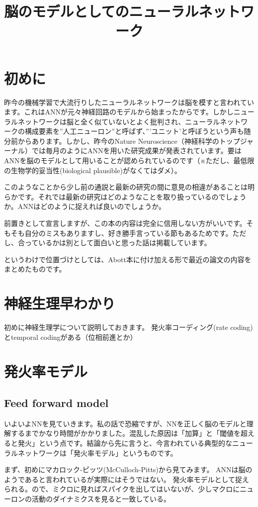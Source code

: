 \documentclass[a4j]{jarticle}
\title{脳のモデルとしてのニューラルネットワーク}
\author{\vspace{-5mm}}
\date{\vspace{-20mm}}
\begin{document}
\maketitle
\tableofcontents
\clearpage
\section{初めに}
昨今の機械学習で大流行りしたニューラルネットワークは脳を模すと言われています。これはANNが元々神経回路のモデルから始まったからです。しかしニューラルネットワークは脳と全く似ていないとよく批判され、ニューラルネットワークの構成要素を''人工ニューロン''と呼ばず、'''ユニット'と呼ぼうという声も随分前からあります。しかし、昨今のNature Neuroscience（神経科学のトップジャーナル）では毎月のようにANNを用いた研究成果が発表されています。要はANNを脳のモデルとして用いることが認められているのです（※ただし、最低限の生物学的妥当性(biological plausible)がなくてはダメ）。\par
このようなことから少し前の通説と最新の研究の間に意見の相違があることは明らかです。それでは最新の研究はどのようなことを取り扱っているのでしょうか。ANNはどのように捉えれば良いのでしょうか。\par
前置きとして宣言しますが、この本の内容は完全に信用しない方がいいです。そもそも自分のミスもありますし、好き勝手言っている節もあるためです。ただし、合っているかは別として面白いと思った話は掲載しています。\par
というわけで位置づけとしては、Abott本に付け加える形で最近の論文の内容をまとめたものです。
\section{神経生理早わかり}
初めに神経生理学について説明しておきます。
発火率コーディング(rate coding)とtemporal codingがある（位相前進とか）
\section{発火率モデル}
\subsection{Feed forward model}
いよいよNNを見ていきます。私の話で恐縮ですが、NNを正しく脳のモデルと理解するまでかなり時間がかかりました。混乱した原因は「加算」と「閾値を超えると発火」という点です。結論から先に言うと、今言われている典型的なニューラルネットワークは「発火率モデル」というものです。\par
まず、初めにマカロック-ピッツ(McCulloch-Pitts)から見てみます。
ANNは脳のようであると言われているが実際にはそうではない。
発火率モデルとして捉えられる。ので、ミクロに見ればスパイクを出してはいないが、少しマクロにニューロンの活動のダイナミクスを見ると一致している。
\end{document}
